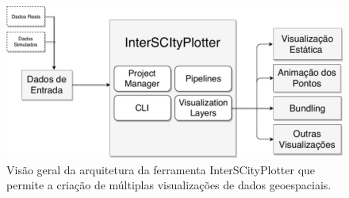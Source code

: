 \begin{figure}[!htb]
  \centering
  \includegraphics[width=1\textwidth]{../figuras/interscityplotter.pdf}
  \caption{Visão geral da arquitetura da ferramenta InterSCityPlotter que permite a criação
de múltiplas visualizações de dados geoespaciais.}
  \label{fig:interscityplotter}
\end{figure}

